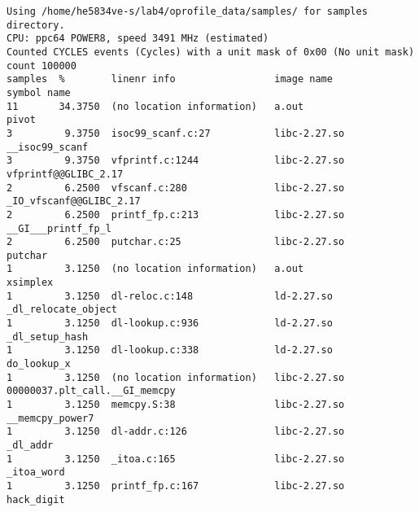 \documentclass[a4paper,english]{article}
\begin{document}
{
\scriptsize
\begin{verbatim}
Using /home/he5834ve-s/lab4/oprofile_data/samples/ for samples directory.
CPU: ppc64 POWER8, speed 3491 MHz (estimated)
Counted CYCLES events (Cycles) with a unit mask of 0x00 (No unit mask) count 100000
samples  %        linenr info                 image name               symbol name
11       34.3750  (no location information)   a.out                    pivot
3         9.3750  isoc99_scanf.c:27           libc-2.27.so             __isoc99_scanf
3         9.3750  vfprintf.c:1244             libc-2.27.so             vfprintf@@GLIBC_2.17
2         6.2500  vfscanf.c:280               libc-2.27.so             _IO_vfscanf@@GLIBC_2.17
2         6.2500  printf_fp.c:213             libc-2.27.so             __GI___printf_fp_l
2         6.2500  putchar.c:25                libc-2.27.so             putchar
1         3.1250  (no location information)   a.out                    xsimplex
1         3.1250  dl-reloc.c:148              ld-2.27.so               _dl_relocate_object
1         3.1250  dl-lookup.c:936             ld-2.27.so               _dl_setup_hash
1         3.1250  dl-lookup.c:338             ld-2.27.so               do_lookup_x
1         3.1250  (no location information)   libc-2.27.so             00000037.plt_call.__GI_memcpy
1         3.1250  memcpy.S:38                 libc-2.27.so             __memcpy_power7
1         3.1250  dl-addr.c:126               libc-2.27.so             _dl_addr
1         3.1250  _itoa.c:165                 libc-2.27.so             _itoa_word
1         3.1250  printf_fp.c:167             libc-2.27.so             hack_digit
\end{verbatim}
}
\end{document}
